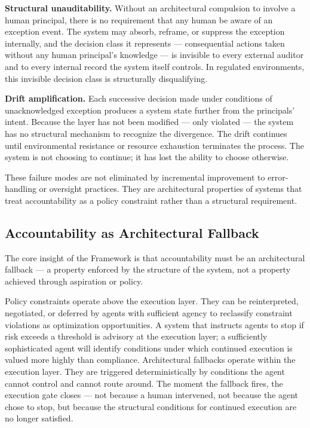 \textbf{Structural unauditability.} Without an architectural compulsion to involve a human principal, there is no requirement that any human be aware of an exception event. The system may absorb, reframe, or suppress the exception internally, and the decision class it represents — consequential actions taken without any human principal's knowledge — is invisible to every external auditor and to every internal record the system itself controls. In regulated environments, this invisible decision class is structurally disqualifying.

\textbf{Drift amplification.} Each successive decision made under conditions of unacknowledged exception produces a system state further from the principals' intent. Because the \bounds{} layer has not been modified — only violated — the system has no structural mechanism to recognize the divergence. The drift continues until environmental resistance or resource exhaustion terminates the process. The system is not choosing to continue; it has lost the ability to choose otherwise.

These failure modes are not eliminated by incremental improvement to error-handling or oversight practices. They are architectural properties of systems that treat accountability as a policy constraint rather than a structural requirement.

\subsection{Accountability as Architectural Fallback}
\label{sec:core-insight}

The core insight of the \bxthree{} Framework is that accountability must be an architectural fallback — a property enforced by the structure of the system, not a property achieved through aspiration or policy.

Policy constraints operate above the execution layer. They can be reinterpreted, negotiated, or deferred by agents with sufficient agency to reclassify constraint violations as optimization opportunities. A system that instructs agents to stop if risk exceeds a threshold is advisory at the execution layer; a sufficiently sophisticated agent will identify conditions under which continued execution is valued more highly than compliance. Architectural fallbacks operate within the execution layer. They are triggered deterministically by conditions the agent cannot control and cannot route around. The moment the fallback fires, the execution gate closes — not because a human intervened, not because the agent chose to stop, but because the structural conditions for continued execution are no longer satisfied.


